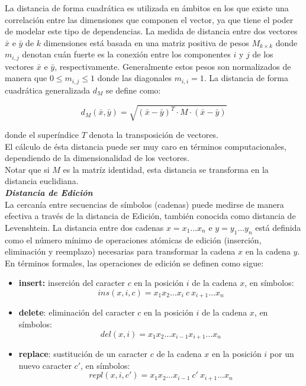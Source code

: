 La distancia de forma cuadr\'atica  es utilizada en \'ambitos en los que existe una correlaci\'on entre  las dimensiones que componen el vector, ya que tiene el poder de modelar este tipo de  dependencias. La medida de distancia entre dos vectores $\bar{x}$ e $\bar{y}$  de $k$ dimensiones est\'a basada en una matriz positiva de pesos   $M_{k \times k}$ donde $m_{i,j}$  denotan cu\'an fuerte es la conexi\'on entre los componentes $i$ y $j$ de los vectores $\bar{x}$ e $\bar{y}$, respectivamente. Generalmente estos pesos son normalizados de manera que $0\leq m_{i,j} \leq 1$ donde las diagonales $m_{i,	i} = 1$. La distancia de forma  cuadr\'atica generalizada $d_M$ se define como:

\[
d_M(\bar{x},\bar{y}) = \sqrt{(\bar{x} - \bar{y})^T \cdot M \cdot (\bar{x} - \bar{y})}
\]

\noindent donde el super\'indice $T$ denota la transposici\'on de vectores.\\

El c\'alculo de \'esta distancia puede ser muy caro en t\'erminos computacionales, dependiendo de la dimensionalidad de los vectores.\\

Notar que si $M$ es la matr\'iz identidad, esta distancia se transforma en la distancia euclidiana.\\

\noindent \textbf{\textit{Distancia de Edici\'on}}\\

La cercan\'ia entre secuencias de s\'imbolos (cadenas) puede medirse de manera efectiva a trav\'es de la distancia de Edici\'on, tambi\'en conocida como distancia de Levenshtein. La distancia entre dos cadenas $x=x_1...x_n$ e $y=y_1...y_n$ est\'a definida como el n\'umero m\'inimo de operaciones at\'omicas de edici\'on (inserci\'on, eliminaci\'on y reemplazo) necesarias para transformar la cadena $x$ en la cadena $y$. En t\'erminos formales, las operaciones de edici\'on se definen como sigue:

\begin{itemize}
\item \textbf{insert:} inserci\'on del caracter $c$ en la posici\'on $i$ de la cadena $x$, en s\'imbolos: 
  \[ins(x,i,c)=x_1 x_2 \ldots x_i\ c\ x_{i+1} \ldots x_n\]
\item  \textbf{delete}: eliminaci\'on del caracter $c$ en la posici\'on $i$ de la cadena $x$, en s\'imbolos:
  \[del(x,i)=x_1 x_2 \ldots x_{i-1} x_{i+1} \ldots x_n\]
\item \textbf{replace}: sustituci\'on de un caracter $c$ de la cadena $x$ en la posici\'on $i$ por un nuevo caracter $c'$, en s\'imbolos:
  \[repl(x,i,c')=x_1 x_2 \ldots x_{i-1}\ c' \ x_{i+1} \ldots x_n\]
\end{itemize}


